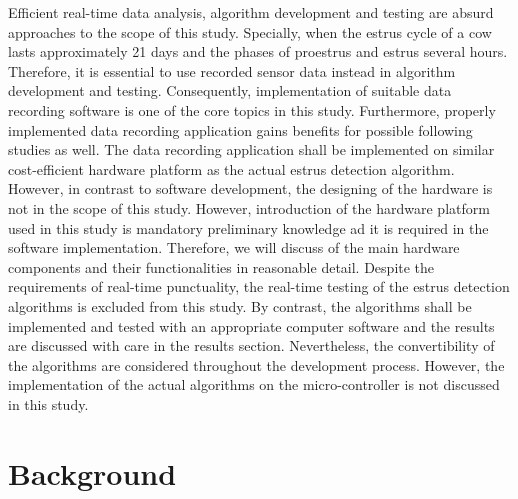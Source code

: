 \documentclass[english,12pt,a4paper,pdftex,elec,utf8]{aaltothesis}
\begin{document}
Efficient real-time data analysis, algorithm development and testing are absurd approaches to the scope of this study. Specially, when the estrus cycle of a cow lasts approximately 21 days and the phases of proestrus and estrus several hours. Therefore, it is essential to use recorded sensor data instead in algorithm development and testing. Consequently, implementation of suitable data recording software is one of the core topics in this study. Furthermore, properly implemented data recording application gains benefits for possible following studies as well. The data recording application shall be implemented on similar cost-efficient hardware platform as the actual estrus detection algorithm. However, in contrast to software development, the designing of the hardware is not in the scope of this study. However, introduction of the hardware platform used in this study is mandatory preliminary knowledge ad it is required in the software implementation. Therefore, we will discuss of the main hardware components and their functionalities in reasonable detail. Despite the requirements of real-time punctuality, the real-time testing of the estrus detection algorithms is excluded from this study. By contrast, the algorithms shall be implemented and tested with an appropriate computer software  and the results are discussed with care in the results section. Nevertheless, the convertibility of the algorithms are considered throughout the development process. However, the implementation of the actual algorithms on the micro-controller is not discussed in this study.


%
%
%
%



\clearpage 

\section{Background} \label{backgroundsection}
 
\end{document}
